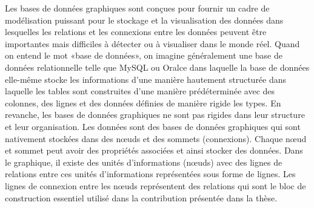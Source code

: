 \documentclass[12pt]{article}
\begin{document}
Les bases de données graphiques sont conçues pour fournir un cadre de modélisation puissant pour le stockage et la visualisation des données dans lesquelles les relations et les connexions entre les données peuvent être importantes mais difficiles à détecter ou à visualiser dans le monde réel. Quand on entend le mot «base de données», on imagine généralement une base de données relationnelle telle que MySQL ou Oralce dans laquelle la base de données elle-même stocke les informations d'une manière hautement structurée dans laquelle les tables sont construites d'une manière prédéterminée avec des colonnes, des lignes et des données définies de manière rigide les types. En revanche, les bases de données graphiques ne sont pas rigides dans leur structure et leur organisation. Les données sont des bases de données graphiques qui sont nativement stockées dans des nœuds et des sommets (connexions). Chaque nœud et sommet peut avoir des propriétés associées et ainsi stocker des données. Dans le graphique, il existe des unités d'informations (nœuds) avec des lignes de relations entre ces unités d'informations représentées sous forme de lignes. Les lignes de connexion entre les nœuds représentent des relations qui sont le bloc de construction essentiel utilisé dans la contribution présentée dans la thèse.

\end{document}
